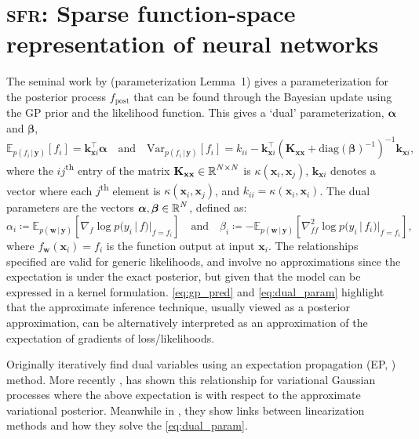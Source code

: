 \documentclass{article}
\renewcommand{\paragraph}[1]{{\bf #1}~~}
\newcommand{\our}{\textsc{sfr}\xspace}
\newcommand{\mathbold}[1]{\bm{#1}}
\newcommand{\mbf}[1]{\mathbf{#1}}
\renewcommand{\mid}{\,|\,}
\newcommand{\valpha}[0]{\mathbold{\alpha}}
\newcommand{\vbeta}[0]{\mathbold{\beta}}
\newcommand{\diag}{\text{{diag}}}
\newcommand{\vx}{\mbf{x}}
\newcommand{\vy}{\mbf{y}}
\newcommand{\vw}{\mbf{w}}
\newcommand{\MKxx}{\mbf{K}_{\mbf{x}\mbf{x}}}
\newcommand{\vk}{\mbf{k}}
\newcommand{\myexpect}{\mathbb{E}}
\begin{document}
\section{\our: Sparse function-space representation of neural networks}
The seminal work by \citet{csato2002sparse} (parameterization Lemma~1) gives a parameterization for the posterior process $f_{\textrm{post}}$  that can be found through the Bayesian update using the GP prior and the likelihood function. This gives a `dual' parameterization, $\valpha$ and $\vbeta$,
%
\begin{equation}  \label{eq:gp_pred}
  \myexpect_{p(f_i \mid\vy)}[f_i]= \vk_{\vx i}^\top \valpha \quad \text{and} \quad
  \mathrm{Var}_{p(f_i \mid \vy)}[f_i] = k_{ii} - \vk_{\vx i}^\top ( \MKxx + \diag(\vbeta)^{-1})^{-1} \vk_{\vx i},
\end{equation}
%
where the $ij$\textsuperscript{th} entry of the matrix $\MKxx \in \R^{N \times N}$ is $\kappa(\vx_i,\vx_j)$, $\vk_{\vx i}$ denotes a vector where each $j$\textsuperscript{th} element is $\kappa(\vx_i, \vx_j)$, and $k_{ii} = \kappa(\vx_i, \vx_i)$.  The dual parameters are the vectors $\valpha, \vbeta \in \R^{N}$, defined as:
%
\begin{equation}
  \label{eq:dual_param}
  \alpha_i \coloneqq \myexpect_{p(\vw \mid \vy)}[\nabla_{f}\log p(y_i \mid f) |_{f=f_i}]
  \quad \text{and} \quad
  \beta_i \coloneqq - \myexpect_{p(\vw \mid \vy)}[\nabla^2_{f f}\log p(y_i \mid f_i) |_{f=f_i}],
\end{equation}
%
where $f_\vw(\vx_i) = f_i$ is the function output at input $\vx_i$. The relationships specified are valid for generic likelihoods, and involve no approximations since the expectation is under the exact posterior, but given that the model can be expressed in a kernel formulation. \cref{eq:gp_pred} and \cref{eq:dual_param} highlight that the approximate inference technique, usually viewed as a posterior approximation, can be alternatively interpreted as an approximation of the expectation of gradients of loss/likelihoods.

Originally \citet{csato2002sparse} iteratively find dual variables using an expectation propagation (EP, \cite{minka2001expectation}) method. More recently \cite{khan2017conjugate,adam2021dual}, has shown this relationship for variational Gaussian processes where the above expectation is with respect to the approximate variational posterior. Meanwhile in \citet{wilkinson2023bayes}, they show links between linearization methods and how they solve the  \cref{eq:dual_param}.
\end{document}
